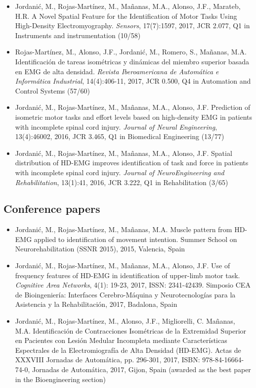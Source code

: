 \begin{itemize}
\item Jordanić, M., Rojas-Martínez, M., Mañanas, M.A., Alonso, J.F., Marateb, H.R. A Novel Spatial Feature for the Identification of Motor Tasks Using High-Density Electromyography. \textit{Sensors}, 17(7):1597, 2017, JCR 2.077, Q1 in Instruments and instrumentation (10/58)

\item Rojas-Martínez, M., Alonso, J.F., Jordanić, M., Romero, S., Mañanas, M.A. Identificación de tareas isométricas y dinámicas del miembro superior basada en EMG de alta densidad. \textit{Revista Iberoamericana de Automática e Informática Industrial}, 14(4):406-11, 2017, JCR 0.500, Q4 in Automation and Control Systems (57/60)

\item Jordanić, M., Rojas-Martínez, M., Mañanas, M.A., Alonso, J.F. Prediction of isometric motor tasks and effort levels based on high-density EMG in patients with incomplete spinal cord injury. \textit{Journal of Neural Engineering}, 13(4):46002, 2016, JCR 3.465, Q1 in Biomedical Engineering (13/77)

\item Jordanić, M., Rojas-Martínez, M., Mañanas, M.A., Alonso, J.F. Spatial distribution of HD-EMG improves identification of task and force in patients with incomplete spinal cord injury. \textit{Journal of NeuroEngineering and Rehabilitation}, 13(1):41, 2016, JCR 3.222, Q1 in Rehabilitation (3/65)
\end{itemize}


\subsection{Conference papers}

\begin{itemize}
\item Jordanić, M., Rojas-Martínez, M., Mañanas, M.A. Muscle pattern from HD-EMG applied to identification of movement intention. Summer School on Neurorehabilitation (SSNR 2015), 2015, Valencia, Spain

\item   Jordanić, M., Rojas-Martínez, M., Mañanas, M.A., Alonso, J.F. Use of frequency features of HD-EMG in identification of upper-limb motor task. \textit{Cognitive Area Networks}, 4(1): 19-23, 2017, ISSN: 2341-42439. Simposio CEA de Bioingeniería: Interfaces Cerebro-Máquina y Neurotecnologías para la Asistencia y la Rehabilitación, 2017, Badalona, Spain

\item Jordanić, M., Rojas-Martínez, M., Alonso, J.F., Migliorelli, C. Mañanas, M.A. Identificación de Contracciones Isométricas de la Extremidad Superior en Pacientes con Lesión Medular Incompleta mediante Características Espectrales de la Electromiografía de Alta Densidad (HD-EMG). Actas de XXXVIII Jornadas de Automática, pp. 296-301, 2017, ISBN: 978-84-16664-74-0, Jornadas de Automática, 2017, Gijon, Spain (awarded as the best paper in the Bioengineering section)

	
\end{itemize}


